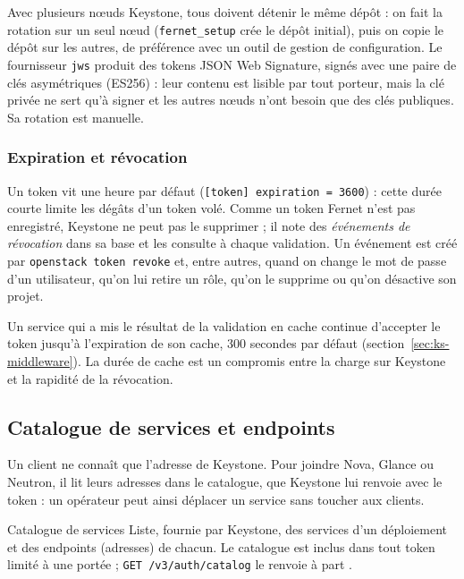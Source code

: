 Avec plusieurs nœuds Keystone, tous doivent détenir le même dépôt : on fait la rotation sur un seul nœud (\texttt{fernet\_setup} crée le
dépôt initial), puis on copie le dépôt sur les autres, de préférence avec un outil de gestion de configuration. Le fournisseur
\texttt{jws} produit des tokens JSON Web Signature, signés avec une paire de clés asymétriques (ES256) \parencite{keystone-jws} : leur
contenu est lisible par tout porteur, mais la clé privée ne sert qu'à signer et les autres nœuds n'ont besoin que des clés publiques. Sa
rotation est manuelle.

\subsubsection{Expiration et révocation}\label{sec:ks-revocation}

Un token vit une heure par défaut (\texttt{[token] expiration = 3600}) : cette durée courte limite les dégâts d'un token volé. Comme un
token Fernet n'est pas enregistré, Keystone ne peut pas le supprimer ; il note des \emph{événements de révocation} dans sa base et les
consulte à chaque validation. Un événement est créé par \texttt{openstack token revoke} et, entre autres, quand on change le mot de
passe d'un utilisateur, qu'on lui retire un rôle, qu'on le supprime ou qu'on désactive son projet.

\begin{remarque}
Un service qui a mis le résultat de la validation en cache continue d'accepter le token jusqu'à
l'expiration de son cache, 300 secondes par défaut (section~\ref{sec:ks-middleware}). La durée de
cache est un compromis entre la charge sur Keystone et la rapidité de la révocation.
\end{remarque}

\subsection{Catalogue de services et endpoints}\label{sec:ks-catalogue}

Un client ne connaît que l'adresse de Keystone. Pour joindre Nova, Glance ou Neutron, il lit leurs adresses dans le \gls{catalogue}, que
Keystone lui renvoie avec le token : un opérateur peut ainsi déplacer un service sans toucher aux clients.

\begin{definition}{Catalogue de services}
Liste, fournie par Keystone, des services d'un déploiement et des \glspl{endpoint} (adresses) de
chacun. Le catalogue est inclus dans tout token limité à une portée ; \texttt{GET /v3/auth/catalog}
le renvoie à part \parencite{api-identity}.
\end{definition}

